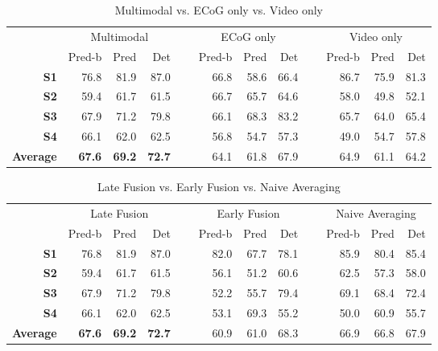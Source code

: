 \documentclass[letterpaper]{article} %
\begin{document}
\begin{table*}[h]
\centering
\caption{Multimodal vs. ECoG only vs. Video only
\label{tab:modalities}
}
\begin{tabular}{@{}rrrrrrrrrrrr@{}}
\toprule
& \multicolumn{3}{c}{Multimodal} &~& \multicolumn{3}{c}{ECoG only} &~& \multicolumn{3}{c}{Video only} \\
& Pred-b & Pred & Det && Pred-b & Pred & Det && Pred-b & Pred & Det \\
\cmidrule{2-4} \cmidrule{6-8} \cmidrule{10-12} 
\textbf{S1}        & 76.8  & 81.9 & 87.0 && 66.8 & 58.6 & 66.4 && 86.7 & 75.9 & 81.3\\ 
\textbf{S2}        & 59.4  & 61.7 & 61.5 && 66.7 & 65.7 & 64.6 && 58.0 & 49.8 & 52.1\\ 
\textbf{S3}        & 67.9  & 71.2 & 79.8 && 66.1 & 68.3 & 83.2 && 65.7 & 64.0 & 65.4\\  
\textbf{S4}        & 66.1  & 62.0 & 62.5 && 56.8 & 54.7 & 57.3 && 49.0 & 54.7 & 57.8\\ 
\cmidrule{2-4} \cmidrule{6-8} \cmidrule{10-12} 

\textbf{Average}   & \textbf{67.6}  & \textbf{69.2} & \textbf{72.7} && 64.1 & 61.8 & 67.9 && 64.9 & 61.1 & 64.2 \\
\bottomrule
\end{tabular}
\end{table*}

\begin{table*}[h]
\centering
\caption{Late Fusion vs. Early Fusion vs. Naive Averaging
\label{tab:earlyvlate}
}
\begin{tabular}{@{}rrrrrrrrrrrr@{}}
\toprule
& \multicolumn{3}{c}{Late Fusion} &~& \multicolumn{3}{c}{Early Fusion} &~& \multicolumn{3}{c}{Naive Averaging} \\
& Pred-b & Pred & Det && Pred-b & Pred & Det && Pred-b & Pred & Det \\
\cmidrule{2-4} \cmidrule{6-8} \cmidrule{10-12} 
\textbf{S1}        & 76.8  & 81.9 & 87.0 && 82.0 & 67.7 & 78.1 && 85.9 & 80.4 & 85.4\\ 
\textbf{S2}        & 59.4  & 61.7 & 61.5 && 56.1 & 51.2 & 60.6 && 62.5 & 57.3 & 58.0  \\ 
\textbf{S3}        & 67.9  & 71.2 & 79.8 && 52.2 & 55.7 & 79.4 && 69.1 & 68.4 & 72.4\\  
\textbf{S4}        & 66.1  & 62.0 & 62.5 && 53.1 & 69.3 & 55.2 && 50.0 & 60.9 & 55.7\\ 
\cmidrule{2-4} \cmidrule{6-8} \cmidrule{10-12} 

\textbf{Average}   & \textbf{67.6}  & \textbf{69.2} & \textbf{72.7} && 60.9 & 61.0 & 68.3 && 66.9 & 66.8 & 67.9 \\
\bottomrule
\end{tabular}
\end{table*}
\end{document}
